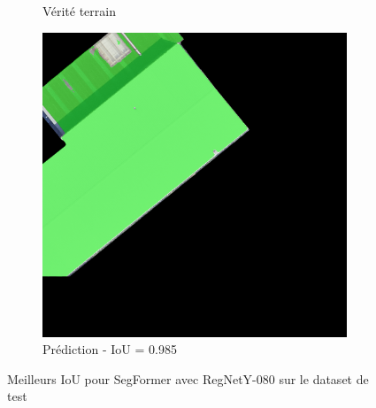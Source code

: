 \begin{figure}[H]
\begin{subfigure}{0.32\textwidth}
    \caption{Vérité terrain}
\end{subfigure}
\hfill
\begin{subfigure}{0.32\textwidth}
    \includegraphics[width=\textwidth]{02-main//figures/ch4/kfold_ensembles/segformer_tu-regnety_080.ra3_in1k/best_cases/best_2_iou0.985_24931117_tile_18_5_f475a0_overlay_pred.png}
    \caption{Prédiction - IoU = 0.985}
\end{subfigure}

\caption{Meilleurs IoU pour SegFormer avec RegNetY-080 sur le dataset de test}
\label{fig:segformer_regnety_080_best_cases}
\end{figure}



